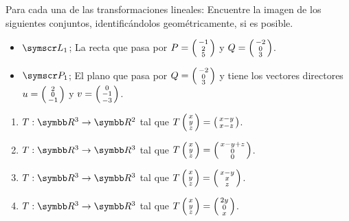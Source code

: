 \item Para cada una de las transformaciones lineales:
    Encuentre la imagen de los siguientes conjuntos, identificándolos geométricamente, si es posible.
    \begin{itemize}
        \item \(\fl_1\); La recta que pasa por \(P = \fsmvec{-1,2,5}\) y \(Q = \fsmvec{-2,0,3}\).
        \item \(\fp_1\); El plano que pasa por \(Q = \fsmvec{-2,0,3}\) y tiene los vectores directores \(u = \fsmvec{2,0,-1}\) y \(v = \fsmvec{0,-1,-3}\).
    \end{itemize}
    \begin{enumerate}[label=\listAlph]
        \item \(T: \realR^3 \rightarrow \realR^2\) tal que \(T\fsmvec{x,y,z}=\fsmvec{x-y,x-z}\).
        \item \(T: \realR^3 \rightarrow \realR^3\) tal que \(T\fsmvec{x,y,z}=\fsmvec{x-y+z,0,0}\).
        \item \(T: \realR^3 \rightarrow \realR^3\) tal que \(T\fsmvec{x,y,z}=\fsmvec{x-y,x,z}\).
        \item \(T: \realR^3 \rightarrow \realR^3\) tal que \(T\fsmvec{x,y,z}=\fsmvec{2y,0,x}\).
    \end{enumerate}
